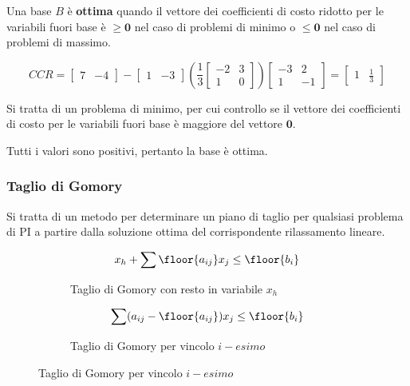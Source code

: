 \documentclass[\main/main.tex]{subfiles}
\begin{document}
\begin{definition}
  Una base $B$ è \textbf{ottima} quando il vettore dei coefficienti di costo ridotto per le variabili fuori base è $\geq \bm{0}$ nel caso di problemi di minimo o $\leq \bm{0}$ nel caso di problemi di massimo.
\end{definition}

\[
  CCR = \begin{bmatrix}
    7 & -4
  \end{bmatrix}
  -
  \begin{bmatrix}
    1 & -3
  \end{bmatrix}
  \left(
  \frac{1}{3}
  \begin{bmatrix}
    -2 & 3 \\
    1  & 0
  \end{bmatrix}
  \right)
  \begin{bmatrix}
    -3 & 2  \\
    1  & -1
  \end{bmatrix}
  = \begin{bmatrix}
    1 & \frac{1}{3}
  \end{bmatrix}
\]

Si tratta di un problema di minimo, per cui controllo se il vettore dei coefficienti di costo per le variabili fuori base è maggiore del vettore $\bm{0}$.

Tutti i valori sono positivi, pertanto la base è ottima.

\subsubsection*{Taglio di Gomory}

\begin{definition}
  Si tratta di un metodo per determinare un piano di taglio per qualsiasi problema di PI a partire dalla soluzione ottima del corrispondente rilassamento lineare.

  \begin{figure}
    \begin{subfigure}{0.49\textwidth}
      \[
        x_h + \sum \floor{a_{ij}}x_j \leq \floor{b_i}
      \]
      \caption{Taglio di Gomory con resto in variabile $x_h$}
      \label{gomory_cut_formula_general}
    \end{subfigure}
    \begin{subfigure}{0.49\textwidth}
      \[
        \sum (a_{ij} - \floor{a_{ij}})x_j \leq \floor{b_i}
      \]
      \caption{Taglio di Gomory per vincolo $i-esimo$}
      \label{gomory_cut_formula}
    \end{subfigure}
  \end{figure}
\end{definition}
\end{document}
